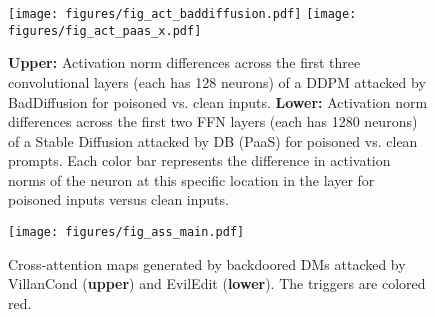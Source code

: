 \begin{figure}[htbp]
    \texttt{[image: figures/fig\_act\_baddiffusion.pdf]}
    \texttt{[image: figures/fig\_act\_paas\_x.pdf]}
    \caption{\textbf{Upper:} Activation norm differences across the first three convolutional layers (each has 128 neurons) of a DDPM attacked by BadDiffusion for poisoned vs. clean inputs. \textbf{Lower:} Activation norm differences across the first two FFN layers (each has 1280 neurons) of a Stable Diffusion attacked by DB (PaaS) for poisoned vs. clean prompts. Each color bar represents the difference in activation norms of the neuron at this specific location in the layer for poisoned inputs versus clean inputs.}
    \label{fig:activation}
\end{figure}

\begin{figure}[htbp]
    \texttt{[image: figures/fig\_ass\_main.pdf]}
    \caption{Cross-attention maps generated by backdoored DMs attacked by VillanCond (\textbf{upper}) and EvilEdit (\textbf{lower}). The triggers are colored red.}
    \label{fig:assimilation}
\end{figure}




